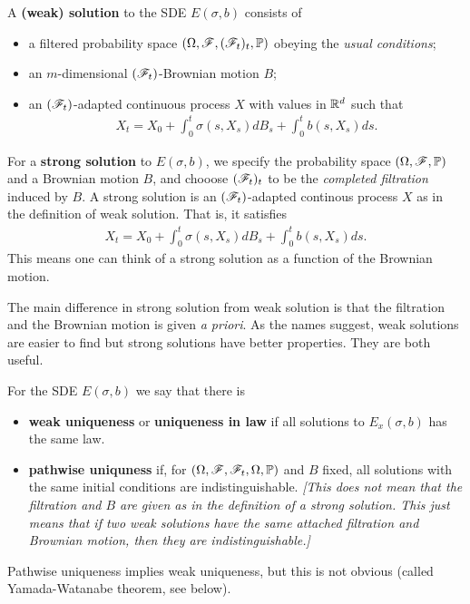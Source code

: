 \documentclass[10pt,a4paper]{article}
\renewenvironment{i}
{\begin{itemize} 
	}%
	{\end{itemize}
}
\begin{document}
 A \textbf{(weak) solution} to the SDE $E(\sigma, b)$ consists of
\begin{i}
\item a filtered probability space $(\Omega, \mathscr{F}, (\mathscr{F}_t)_{t}, \mathbb{P})$ obeying the \emph{usual conditions};
\item an $m$-dimensional $(\mathscr{F}_t)$-Brownian motion $B$;
\item an $(\mathscr{F}_t)$-adapted continuous process $X$ with values in $\mathbb{R}^d$ such that
\begin{align*}
X_t = X_0 + \int_0^t \sigma(s, X_s) dB_s + \int_0^t b(s, X_s) ds.
\end{align*} 
\end{i}
\s

 For a \textbf{strong solution} to $E(\sigma, b)$, we specify the probability space $(\Omega, \mathscr{F}, \mathbb{P})$ and a Brownian motion $B$, and chooose $(\mathscr{F}_t)_t$ to be the \emph{completed filtration} induced by $B$. A strong solution is an $(\mathscr{F}_t)$-adapted continous process $X$ as in the definition of weak solution. That is, it satisfies
\begin{align*}
X_t = X_0 + \int_0^t \sigma(s, X_s) dB_s + \int_0^t b(s, X_s) ds.
\end{align*} 
This means one can think of a strong solution as a function of the Brownian motion.
\s

The main difference in strong solution from weak solution is that the filtration and the Brownian motion is given \textit{a priori}. As the names suggest, weak solutions are easier to find but strong solutions have better properties. They are both useful.
\s

 For the SDE $E(\sigma, b)$ we say that there is
\begin{i}
\item \textbf{weak uniqueness} or \textbf{uniqueness in law} if all solutions to $E_x(\sigma, b)$ has the same law.
\item \textbf{pathwise uniquness} if, for $(\Omega, \mathscr{F}, \mathscr{F}_t, \Omega, \mathbb{P})$ and $B$ fixed, all solutions with the same initial conditions are indistinguishable. \emph{[This does not mean that the filtration and $B$ are given as in the definition of a strong solution. This just means that if two weak solutions have the same attached filtration and Brownian motion, then they are indistinguishable.]}
\end{i}
Pathwise uniqueness implies weak uniqueness, but this is not obvious (called Yamada-Watanabe theorem, see below).
\s
\end{document}
